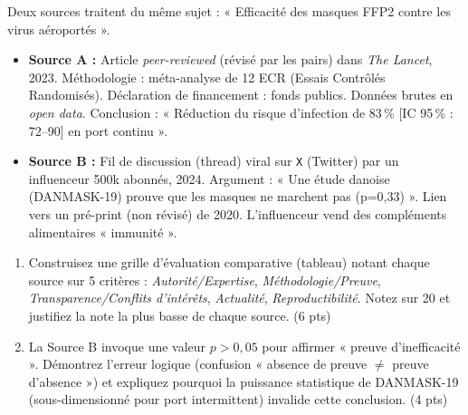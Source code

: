 \documentclass[11pt]{article}
\begin{document}
\begin{exercice}
Deux sources traitent du même sujet : « Efficacité des masques FFP2 contre les virus aéroportés ».
\begin{itemize}
    \item \textbf{Source A :} Article \textit{peer-reviewed} (révisé par les pairs) dans \textit{The Lancet}, 2023. Méthodologie : méta-analyse de 12 ECR (Essais Contrôlés Randomisés). Déclaration de financement : fonds publics. Données brutes en \textit{open data}. Conclusion : « Réduction du risque d'infection de 83\,\% [IC 95\,\% : 72--90] en port continu ».
    \item \textbf{Source B :} Fil de discussion (thread) viral sur \texttt{X} (Twitter) par un influenceur 500k abonnés, 2024. Argument : « Une étude danoise (DANMASK-19) prouve que les masques ne marchent pas (p=0,33) ». Lien vers un pré-print (non révisé) de 2020. L'influenceur vend des compléments alimentaires « immunité ».
\end{itemize}
\begin{enumerate}
    \item Construisez une grille d'évaluation comparative (tableau) notant chaque source sur 5 critères : \textit{Autorité/Expertise}, \textit{Méthodologie/Preuve}, \textit{Transparence/Conflits d'intérêts}, \textit{Actualité}, \textit{Reproductibilité}. Notez sur 20 et justifiez la note la plus basse de chaque source. \hfill (6 pts)
    \item La Source B invoque une valeur $p > 0,05$ pour affirmer « preuve d'inefficacité ». Démontrez l'erreur logique (confusion « absence de preuve $\neq$ preuve d'absence ») et expliquez pourquoi la puissance statistique de DANMASK-19 (sous-dimensionné pour port intermittent) invalide cette conclusion. \hfill (4 pts)
\end{enumerate}
\end{exercice}
\end{document}
